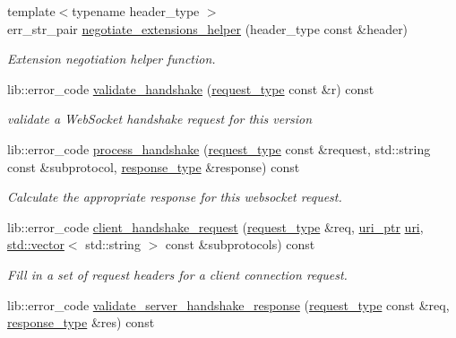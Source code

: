 \begin{DoxyCompactItemize}
{\footnotesize template$<$typename header\+\_\+type $>$ }\\err\+\_\+str\+\_\+pair \mbox{\hyperlink{classwebsocketpp_1_1processor_1_1hybi13_a2bba499a185aa0219c2389532a332393}{negotiate\+\_\+extensions\+\_\+helper}} (header\+\_\+type const \&header)
\begin{DoxyCompactList}\small\item\em Extension negotiation helper function. \end{DoxyCompactList}\item 
lib\+::error\+\_\+code \mbox{\hyperlink{classwebsocketpp_1_1processor_1_1hybi13_af17a224a602ebcda5e481d8c249cf37c}{validate\+\_\+handshake}} (\mbox{\hyperlink{classwebsocketpp_1_1http_1_1parser_1_1request}{request\+\_\+type}} const \&r) const
\begin{DoxyCompactList}\small\item\em validate a Web\+Socket handshake request for this version \end{DoxyCompactList}\item 
lib\+::error\+\_\+code \mbox{\hyperlink{classwebsocketpp_1_1processor_1_1hybi13_aa527ee3ece912ef818a207fce5261383}{process\+\_\+handshake}} (\mbox{\hyperlink{classwebsocketpp_1_1http_1_1parser_1_1request}{request\+\_\+type}} const \&request, std\+::string const \&subprotocol, \mbox{\hyperlink{classwebsocketpp_1_1http_1_1parser_1_1response}{response\+\_\+type}} \&response) const
\begin{DoxyCompactList}\small\item\em Calculate the appropriate response for this websocket request. \end{DoxyCompactList}\item 
lib\+::error\+\_\+code \mbox{\hyperlink{classwebsocketpp_1_1processor_1_1hybi13_a587360571f5bb11b7d0c39b69566bf38}{client\+\_\+handshake\+\_\+request}} (\mbox{\hyperlink{classwebsocketpp_1_1http_1_1parser_1_1request}{request\+\_\+type}} \&req, \mbox{\hyperlink{namespacewebsocketpp_aae370ea5ac83a8ece7712cb39fc23f5b}{uri\+\_\+ptr}} \mbox{\hyperlink{classwebsocketpp_1_1uri}{uri}}, \mbox{\hyperlink{classstd_1_1vector}{std\+::vector}}$<$ std\+::string $>$ const \&subprotocols) const
\begin{DoxyCompactList}\small\item\em Fill in a set of request headers for a client connection request. \end{DoxyCompactList}\item 
lib\+::error\+\_\+code \mbox{\hyperlink{classwebsocketpp_1_1processor_1_1hybi13_a8b3cea2f1526b4982e0836c5705584a8}{validate\+\_\+server\+\_\+handshake\+\_\+response}} (\mbox{\hyperlink{classwebsocketpp_1_1http_1_1parser_1_1request}{request\+\_\+type}} const \&req, \mbox{\hyperlink{classwebsocketpp_1_1http_1_1parser_1_1response}{response\+\_\+type}} \&res) const

\end{DoxyCompactItemize}
